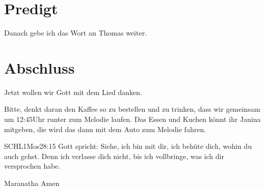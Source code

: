 \documentclass{../../inc/mybib}
\begin{document}
\section{Predigt}

Danach gebe ich das Wort an Thomas weiter.








\section{Abschluss}

Jetzt wollen wir Gott mit dem Lied  danken.

Bitte, denkt daran den Kaffee so zu bestellen und zu trinken, dass wir gemeinsam um 12:45Uhr runter zum Melodie laufen. Das Essen und Kuchen könnt ihr Janina mitgeben, die wird das dann mit dem Auto zum Melodie fahren.
\beten{}

\begin{bibelbox}{SCHL}{1Mos}{28:15}
Gott spricht: Siehe, ich bin mit dir,
ich behüte dich, wohin du auch gehst.
Denn ich verlasse dich nicht,
bis ich vollbringe, was ich dir versprochen habe.
\end{bibelbox}

Maranatha Amen
\end{document}
